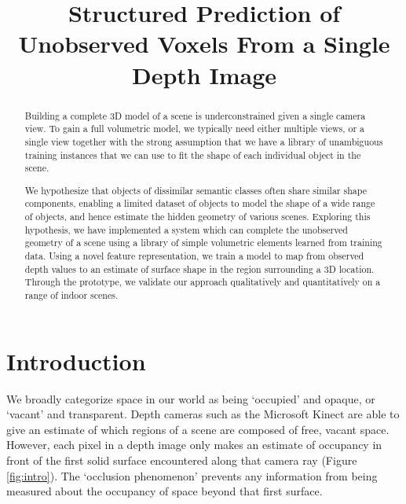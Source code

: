 \documentclass[10pt,twocolumn,letterpaper]{article}
\title{Structured Prediction of Unobserved Voxels From a Single Depth Image}
\begin{document}
\maketitle

\begin{abstract}

  Building a complete 3D model of a scene is underconstrained given a single camera view.
  To gain a full volumetric model, we typically need either multiple views, or a single view together with the strong assumption that we have a library of unambiguous training instances that we can use to fit the shape of each individual object in the scene.

  We hypothesize that objects of dissimilar semantic classes often share similar shape components, enabling a limited dataset of objects to model the shape of a wide range of objects, and hence estimate the hidden geometry of various scenes.
  Exploring this hypothesis, we have implemented a system which can complete the unobserved geometry of a scene using a library of simple volumetric elements learned from training data.
  Using a novel feature representation, we train a model to map from observed depth values to an estimate of surface shape in the region surrounding a 3D location.
  Through the prototype, we validate our approach qualitatively and quantitatively on a range of indoor scenes.

\end{abstract}

\section{Introduction}


We broadly categorize space in our world as being `occupied' and opaque, or `vacant' and transparent.
Depth cameras such as the Microsoft Kinect are able to give an estimate of which regions of a scene are composed of free, vacant space.
However, each pixel in a depth image only makes an estimate of occupancy in front of the first solid surface encountered along that camera ray (Figure \ref{fig:intro}).
The `occlusion phenomenon' prevents any information from being measured about the occupancy of space beyond that first surface.
\end{document}
